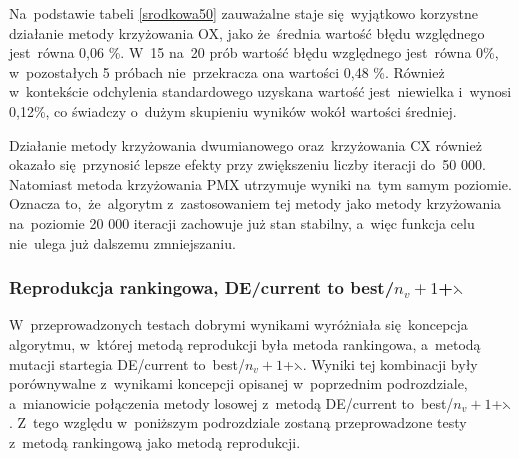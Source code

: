\begin{itemize}
Na~podstawie tabeli \ref{srodkowa50} zauważalne staje się~wyjątkowo korzystne działanie metody krzyżowania OX, jako że~średnia wartość błędu względnego jest~równa 0,06 \%. W~15 na~20 prób wartość błędu względnego jest~równa 0\%, w~pozostałych 5 próbach nie~przekracza ona wartości 0,48 \%. Również w~kontekście odchylenia standardowego uzyskana wartość jest~niewielka i~wynosi 0,12\%, co świadczy o~dużym skupieniu wyników wokół wartości średniej.

\begin{table}[h!]
\begin{center}
\caption{Ranking metod krzyżowania na podstawie średniej wartości błędu względnego funkcji celu, reprodukcja losowa,  mutacja  DE/current to best/$n_{v}+1$+$\leftthreetimes$, 50 000 iteracji.}
\label{rankingcross4}
\end{center}
\end{table}

Działanie metody krzyżowania dwumianowego oraz~krzyżowania CX również okazało się~przynosić lepsze efekty przy zwiększeniu liczby iteracji do~50 000. Natomiast metoda krzyżowania PMX utrzymuje wyniki na~tym samym poziomie. Oznacza to,~że~algorytm z~zastosowaniem tej metody jako metody krzyżowania na~poziomie 20 000 iteracji zachowuje już stan stabilny, a~więc funkcja celu nie~ulega już dalszemu zmniejszaniu.

\end{itemize}

\subsubsection{Reprodukcja rankingowa, DE/current to best/$n_{v}+1$+$\leftthreetimes$}

W~przeprowadzonych testach dobrymi wynikami wyróżniała się~koncepcja algorytmu, w~której metodą reprodukcji była metoda rankingowa, a~metodą mutacji startegia DE/current to~best/$n_{v}+1$+$\leftthreetimes$. Wyniki tej kombinacji były porównywalne z~wynikami koncepcji opisanej w~poprzednim podrozdziale, a~mianowicie połączenia metody losowej z~metodą DE/current to~best/$n_{v}+1$+$\leftthreetimes$. Z~tego względu w~poniższym podrozdziale zostaną przeprowadzone testy z~metodą rankingową jako metodą reprodukcji.

